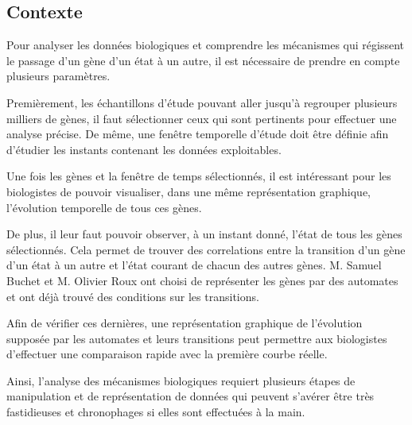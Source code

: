 \subsection{Contexte}
Pour analyser les données biologiques et comprendre les mécanismes qui régissent le passage d'un gène d'un état à un autre, il est nécessaire de prendre en compte plusieurs paramètres. 
\newline 

Premièrement, les échantillons d'étude pouvant aller jusqu'à regrouper plusieurs milliers de gènes, il faut sélectionner ceux qui sont pertinents pour effectuer une analyse précise. De même, une fenêtre temporelle d'étude doit être définie afin d'étudier les instants contenant les données exploitables.
\newline 

Une fois les gènes et la fenêtre de temps sélectionnés, il est intéressant pour les biologistes de pouvoir visualiser, dans une même représentation graphique, l'évolution temporelle de tous ces gènes.
\newline 

De plus, il leur faut pouvoir observer, à un instant donné, l'état de tous les gènes sélectionnés. Cela permet de trouver des correlations entre la transition d'un gène d'un état à un autre et l'état courant de chacun des autres gènes. M. Samuel Buchet et M. Olivier Roux ont choisi de représenter les gènes par des automates et ont déjà trouvé des conditions sur les transitions.
\newline 

Afin de vérifier ces dernières, une représentation graphique de l'évolution supposée par les automates et leurs transitions peut permettre aux biologistes d'effectuer une comparaison rapide avec la première courbe réelle.
\newline 

Ainsi, l'analyse des mécanismes biologiques requiert plusieurs étapes de manipulation et de représentation de données qui peuvent s'avérer être très fastidieuses et chronophages si elles sont effectuées à la main. 
\bigbreak
\bigbreak
